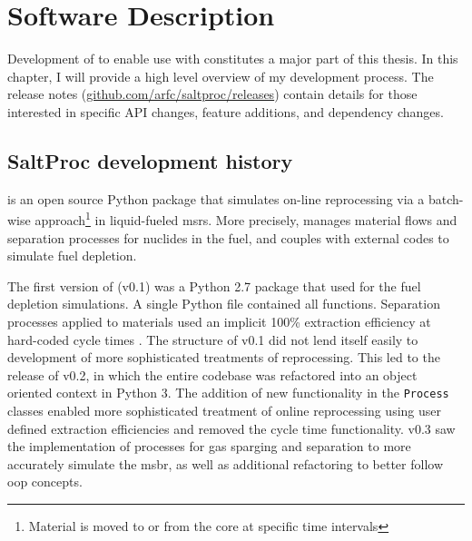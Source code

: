 \chapter{Software Description}
\label{ch:chapter3}
\glsresetall
Development of \SaltProc to enable use with \OpenMC constitutes a major part
of this thesis. In this chapter, I will provide a high level overview
of my development process. The release
notes (\url{github.com/arfc/saltproc/releases}) contain
details for those interested in specific API changes, feature additions,
and dependency changes. 

\section{SaltProc development history}%
\label{sec:saltproc-history}

\SaltProc\cite{rykhlevskii_saltproc_2018} is an open source Python package that
simulates on-line reprocessing via a batch-wise approach\footnote{Material is
moved to or from the core at specific time intervals} in liquid-fueled
\Gls{msr}s. More precisely, \SaltProc manages material flows and separation
processes for nuclides in the fuel, and couples with external codes to simulate
fuel depletion.

The first version of \SaltProc (v0.1) was a Python 2.7 package that used
\SerpentTWO for the fuel depletion simulations. A single Python file contained
all functions. Separation processes applied to materials used an implicit 100\%
extraction efficiency at hard-coded cycle times \cite{rykhlevskii_advanced_2018}.
The structure of \SaltProc v0.1 did not lend itself easily to development of more
sophisticated treatments of reprocessing. This led to the release of \SaltProc
v0.2, in which the entire codebase was refactored into an object oriented
context in Python 3. The addition of new functionality in the \verb.Process.
classes enabled more sophisticated treatment of online reprocessing using user
defined extraction efficiencies and removed the cycle time functionality\cite{rykhlevskii_fuel_2020}.
\SaltProc v0.3 saw the implementation of processes for gas sparging and
separation to more accurately simulate the \gls{msbr}, as well as additional
refactoring to better follow \gls{oop} concepts.

